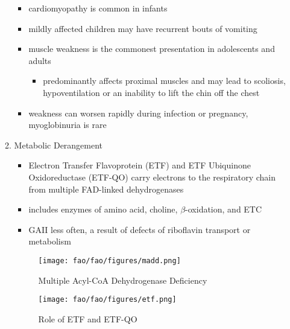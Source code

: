 \documentclass{scrartcl}
\begin{document}
\begin{enumerate}
\begin{enumerate}
\begin{itemize}
\begin{itemize}
\end{itemize}
\item cardiomyopathy is common in infants
\item mildly affected children may have recurrent bouts of vomiting
\item muscle weakness is the commonest presentation in adolescents and adults
\begin{itemize}
\item predominantly affects proximal muscles and may lead to scoliosis,
hypoventilation or an inability to lift the chin off the chest
\end{itemize}
\item weakness can worsen rapidly during infection or pregnancy, myoglobinuria is rare
\end{itemize}

\item Metabolic Derangement
\label{sec:org24e76bd}
\begin{itemize}
\item Electron Transfer Flavoprotein (ETF) and ETF Ubiquinone
Oxidoreductase (ETF-QO) carry electrons to the respiratory chain from
multiple FAD-linked dehydrogenases
\item includes enzymes of amino acid, choline, \(\beta\)-oxidation, and ETC

\item GAII less often, a result of defects of riboflavin transport or
metabolism
\end{itemize}

\begin{figure}[htbp]
\centering
\texttt{[image: fao/fao/figures/madd.png]}
\caption{\label{fig:org8ef0ec5}Multiple Acyl-CoA Dehydrogenase Deficiency}
\end{figure}

\begin{figure}[htbp]
\centering
\texttt{[image: fao/fao/figures/etf.png]}
\caption{\label{fig:org7a3e5fd}Role of ETF and ETF-QO}
\end{figure}


\end{enumerate}
\end{enumerate}
\end{document}
